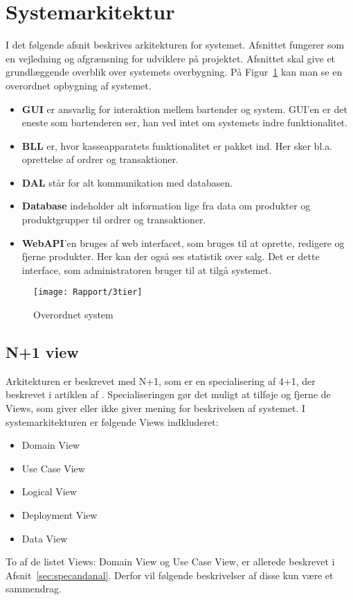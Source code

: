 \newpage
\section{Systemarkitektur}
I det følgende afsnit beskrives arkitekturen for systemet. Afsnittet fungerer som en vejledning og afgrænsning for udviklere på projektet. Afsnittet skal give et grundlæggende overblik over systemets overbygning. På Figur~\ref{fig:ArkiDia} kan man se en overordnet opbygning af systemet.
	
\begin{itemize}
	\item \textbf{\gls{GUI}} er ansvarlig for interaktion mellem \Gls{bartender} og \Gls{system}. \gls{GUI}'en er det eneste som \Gls{bartender}en ser, han ved intet om \gls{system}ets indre funktionalitet.
	\item \textbf{\gls{BLL}} er, hvor kasseapparatets funktionalitet er pakket ind. Her sker bl.a. oprettelse af ordrer og transaktioner.
	\item \textbf{\gls{DAL}} står for alt kommunikation med databasen.
	\item \textbf{Database} indeholder alt information lige fra data om produkter og produktgrupper til ordrer og transaktioner.
	\item \textbf{\gls{WebAPI}}'en bruges af web interfacet, som bruges til at oprette, redigere og fjerne produkter. Her kan der også ses statistik over salg. Det er dette interface, som \Gls{administrator}en bruger til at tilgå \gls{system}et.
\end{itemize}

\begin{figure}[H]
	\centering
	\texttt{[image: Rapport/3tier]}
	\caption{Overordnet system}
	\label{fig:ArkiDia}
\end{figure}

\subsection{N+1 view}
Arkitekturen er beskrevet med N+1, som er en specialisering af 4+1, der beskrevet i artiklen af \cite{4plus1}. Specialiseringen gør det muligt at tilføje og fjerne de Views, som giver eller ikke giver mening for beskrivelsen af \gls{system}et. I systemarkitekturen er følgende Views indkluderet:
\begin{itemize}
	\item Domain View
	\item Use Case View
	\item Logical View
	\item Deployment View
	\item Data View
\end{itemize}
To af de listet Views: Domain View og Use Case View, er allerede beskrevet i Afsnit~\ref{sec:specandanal}. Derfor vil følgende beskrivelser af disse kun være et sammendrag.

